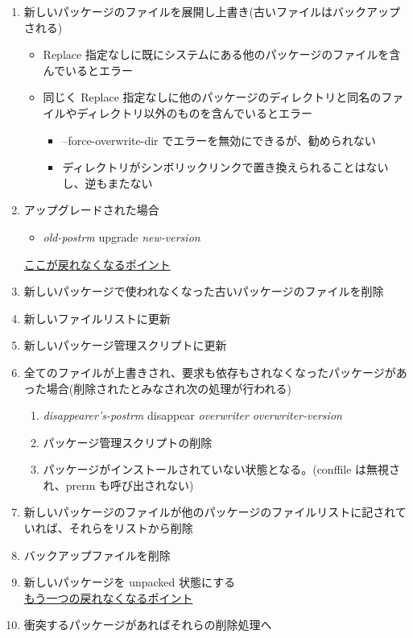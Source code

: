 \documentclass[mingoth,a4paper]{jsarticle}
\begin{document}
\begin{enumerate}
\item 新しいパッケージのファイルを展開し上書き(古いファイルはバックアップされる)
  \begin{itemize}
  \item Replace 指定なしに既にシステムにある他のパッケージのファイルを含んでいるとエラー
  \item 同じく Replace 指定なしに他のパッケージのディレクトリと同名のファイルやディレクトリ以外のものを含んでいるとエラー
    \begin{itemize}
    \item --force-overwrite-dir でエラーを無効にできるが、勧められない
    \item ディレクトリがシンボリックリンクで置き換えられることはないし、逆もまたない
    \end{itemize}
  \end{itemize}

\item アップグレードされた場合
  \begin{itemize}
  \item {\it old-postrm} upgrade {\it new-version}
  \end{itemize}

{\underline {\Large ここが戻れなくなるポイント}}


\item 新しいパッケージで使われなくなった古いパッケージのファイルを削除

\item 新しいファイルリストに更新

\item 新しいパッケージ管理スクリプトに更新

\item 全てのファイルが上書きされ、要求も依存もされなくなったパッケージがあった場合(削除されたとみなされ次の処理が行われる)
  \begin{enumerate}
  \item {\it disappearer's-postrm} disappear {\it overwriter} {\it overwriter-version}
  \item パッケージ管理スクリプトの削除
  \item パッケージがインストールされていない状態となる。(conffile は無視され、prerm も呼び出されない)
  \end{enumerate}

\item 新しいパッケージのファイルが他のパッケージのファイルリストに記されていれば、それらをリストから削除

\item バックアップファイルを削除

\item 新しいパッケージを unpacked 状態にする\\
{\underline {\Large もう一つの戻れなくなるポイント}}

\item 衝突するパッケージがあればそれらの削除処理へ

\end{enumerate}
\end{document}
